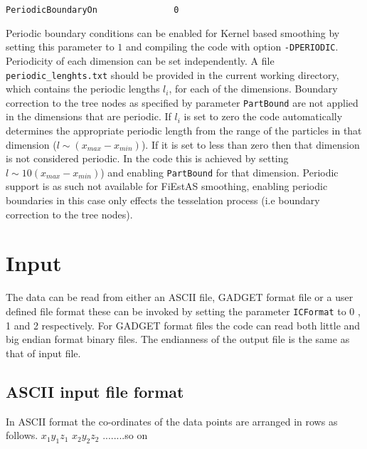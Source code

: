 \documentclass{article}
\begin{document}
\begin{verbatim}
PeriodicBoundaryOn               0
\end{verbatim}
Periodic boundary conditions can be enabled for Kernel based smoothing 
by setting this parameter to $1$ and compiling the code with option \verb$-DPERIODIC$.
Periodicity of each dimension can be set independently. 
A file \verb$periodic_lenghts.txt$ should be provided in the current 
working directory, which contains the periodic lengths $l_i$, for each of the dimensions. 
Boundary correction to the tree nodes as specified by parameter \verb$PartBound$ 
are not applied in the dimensions that  are periodic.
If $l_i$  is set to zero the code automatically determines the appropriate 
periodic length from the range of the particles in that dimension  ($l \sim (x_{max}-x_{min})$). 
If it is set to less than zero then that dimension is not considered periodic. In the code 
this is  achieved by setting $l \sim10 (x_{max}-x_{min})$)  and enabling 
 \verb$PartBound$ for that dimension.   Periodic support is as such not available
 for FiEstAS smoothing, enabling periodic boundaries in this case 
 only effects  the tesselation process (i.e boundary correction to the tree nodes).
 



\section{Input}
The data can be read from either  an ASCII file, GADGET format file
or a user defined file format these can be invoked by setting the
parameter \verb$ICFormat$ to 0 , 1 and 2 respectively.
For GADGET format files the code can 
read both little and big endian format binary files.
The endianness of the output file is the same as that of  input  file.

\subsection{ASCII input file format}
In ASCII format the co-ordinates of the data points are arranged in rows
as follows.
\newline
$x_1 y_1 z_1 $ \newline
$x_2 y_2 z_2 $ \newline
........so on \newline
\end{document}
